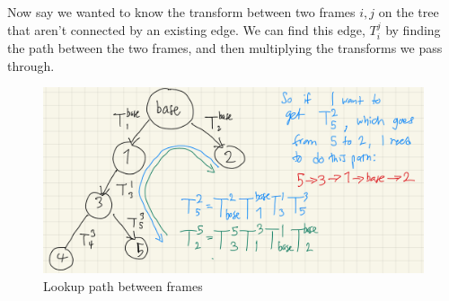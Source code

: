 Now say we wanted to know the transform between two frames $i, j$ on the tree that aren't connected by an existing edge. 
We can find this edge, $T_i^j$ by finding the path between the two frames, and then multiplying the transforms we pass through. 

\begin{figure}
	\centering
	\includegraphics[width=\textwidth]{images/lookup_path.png}
	\caption{Lookup path between frames}
	\label{fig: lookup}
\end{figure}